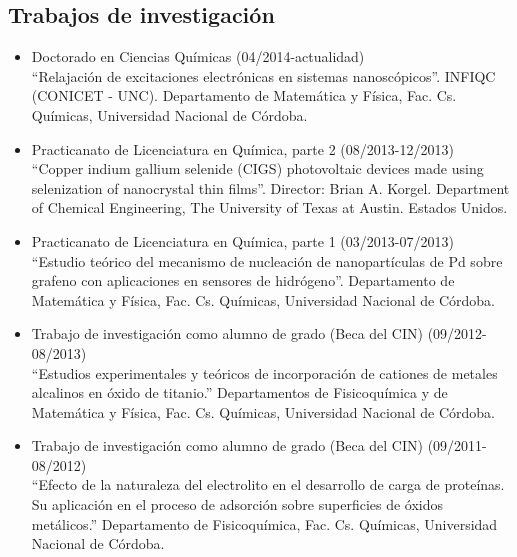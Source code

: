 \documentclass[10pt]{article}
\begin{document}
\subsection{Trabajos de investigación}
\begin{itemize}
 \item {Doctorado en Ciencias Químicas} (04/2014-actualidad) \\
 ``Relajación de excitaciones electrónicas en sistemas nanoscópicos''.
 INFIQC (CONICET - UNC). Departamento de Matemática y Física, Fac. Cs. Químicas, Universidad Nacional de Córdoba.
 \item {Practicanato de Licenciatura en Química, parte 2} (08/2013-12/2013) \\
 ``Copper indium gallium selenide (CIGS) photovoltaic devices made using selenization of nanocrystal thin films''. Director: Brian A. Korgel. Department of Chemical Engineering, The University of Texas at Austin. Estados Unidos.
 \item {Practicanato de Licenciatura en Química, parte 1} (03/2013-07/2013) \\
 ``Estudio teórico del mecanismo de nucleación de nanopartículas de Pd sobre grafeno con aplicaciones en sensores de hidrógeno''. Departamento de Matemática y Física, Fac. Cs. Químicas, Universidad Nacional de Córdoba.
 \item {Trabajo de investigación como alumno de grado (Beca del CIN)} (09/2012-08/2013) \\ 
 ``Estudios experimentales y teóricos de incorporación de cationes de metales alcalinos en óxido de titanio.'' Departamentos de Fisicoquímica y de Matemática y Física, Fac. Cs. Químicas, Universidad Nacional de Córdoba.
 \item {Trabajo de investigación como alumno de grado (Beca del CIN)} (09/2011-08/2012) \\ 
 ``Efecto de la naturaleza del electrolito en el desarrollo de carga de proteínas. Su aplicación en el proceso de adsorción sobre superficies de óxidos metálicos.'' Departamento de Fisicoquímica, Fac. Cs. Químicas, Universidad Nacional de Córdoba. 
\end{itemize}
\end{document}

